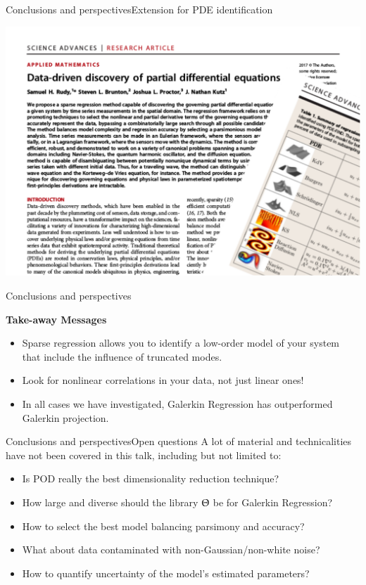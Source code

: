 \documentclass[usenames,dvipsnames,svgnames,10pt,aspectratio=169]{beamer}
\begin{document}
\begin{frame}[t, c]{Conclusions and perspectives}{Extension for PDE identification}
	\centering

	\includegraphics[height=.75\textheight]{pde_find}

	\vspace{2cm}
\end{frame}

\begin{frame}[t, c]{Conclusions and perspectives}{}
	\begin{block}{\centering \textbf{Take-away Messages}}
		\bigskip
		\begin{itemize}
			\item Sparse regression allows you to identify a low-order model of your system that include the influence of truncated modes.
			\medskip
			\item Look for nonlinear correlations in your data, not just linear ones!
			\medskip
			\item In all cases we have investigated, Galerkin Regression has outperformed Galerkin projection.
		\end{itemize}
	\end{block}
	\vspace{1cm}
\end{frame}

\begin{frame}[t, c]{Conclusions and perspectives}{Open questions}
	A lot of material and technicalities have not been covered in this talk, including but not limited to:
	\medskip
	\begin{itemize}
		\item Is POD really the best dimensionality reduction technique?
		\smallskip
		\item How large and diverse should the library $\Uptheta$ be for Galerkin Regression?
		\smallskip
		\item How to select the best model balancing parsimony and accuracy?
		\smallskip
		\item What about data contaminated with non-Gaussian/non-white noise?
		\smallskip
		\item How to quantify uncertainty of the model's estimated parameters?
	\end{itemize}
\end{frame}
\end{document}
